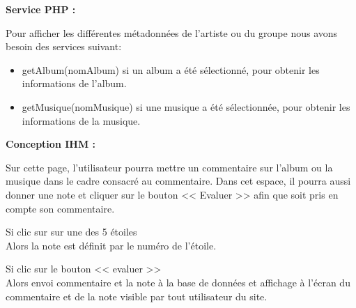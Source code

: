            \begin{paragraphe}
                \textbf{Service PHP :}
            \end{paragraphe}

            \begin{paragraphe}
                Pour afficher les différentes métadonnées de l'artiste ou du groupe nous avons besoin des services suivant:
                \begin{itemize}
                        \item getAlbum(nomAlbum) si un album a été sélectionné, pour obtenir les informations de l'album.
                        \item getMusique(nomMusique) si une musique a été sélectionnée, pour obtenir les informations de la musique.
                \end{itemize}
            \end{paragraphe}

            \begin{paragraphe}
                \textbf{Conception IHM :}
            \end{paragraphe}

			\begin{paragraphe}
				Sur cette page, l'utilisateur pourra mettre un commentaire sur l'album ou la musique dans le cadre consacré au commentaire.
				Dans cet espace, il pourra aussi donner une note et cliquer sur le bouton << Evaluer >> afin que soit pris en compte son commentaire.
			\end{paragraphe}

			\begin{paragraphe}
				Si clic sur sur une des 5 étoiles \\
				Alors la note est définit par le numéro de l'étoile.
			\end{paragraphe}

			\begin{paragraphe}
				Si clic sur le bouton << evaluer >> \\
				Alors envoi commentaire et la note à la base de données et affichage à l'écran du commentaire et de la note visible par tout utilisateur du site.
			\end{paragraphe}


           \newpage


